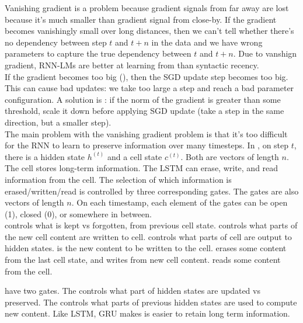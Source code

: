\documentclass{article}
\begin{document}
Vanishing gradient is a problem because gradient signals from far away are lost because it's much smaller than gradient signal from close-by. If the gradient becomes vanishingly small over long distances, then we can't tell whether there's no dependency between step $t$ and $t+n$ in the data and we have wrong parameters to capture the true dependency between $t$ and $t+n$. Due to vanshign gradient, RNN-LMs are better at learning from  than syntactic recency. \\ 

If the gradient becomes too big (), then the SGD update step becomes too big. This can cause bad updates: we take too large a step and reach a bad parameter configuration. A solution is : if the norm of the gradient is greater than some threshold, scale it down before applying SGD update (take a step in the same direction, but a smaller step). \\ 

The main problem with the vanishing gradient problem is that it's too difficult for the RNN to learn to preserve information over many timesteps. In , on step $t$, there is a hidden state $h^{(t)}$ and a cell state $c^{(t)}$. Both are vectors of length $n$. The cell stores long-term information. The LSTM can erase, write, and read information from the cell. The selection of which information is erased/written/read is controlled by three corresponding gates. The gates are also vectors of length $n$. On each timestamp, each element of the gates can be open (1), closed (0), or somewhere in between. \\ 

 controls what is kept vs forgotten, from previous cell state.  controls what parts of the new cell content are written to cell.  controls what parts of cell are output to hidden states.  is the new content to be written to the cell.  erases some content from the last cell state, and writes from new cell content.  reads some content from the cell. 

 have two gates. The  controls what part of hidden states are updated vs preserved. The  controls what parts of previous hidden states are used to compute new content. Like LSTM, GRU makes is easier to retain long term information. \\ 
\end{document}
